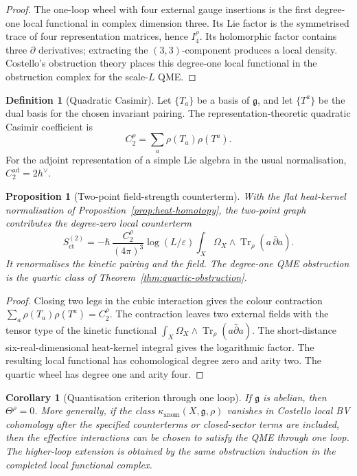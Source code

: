 \documentclass[11pt]{amsart}
\providecommand{\dbar}{\bar{\partial}}
\providecommand{\fg}{\mathfrak{g}}
\providecommand{\ad}{\operatorname{ad}}
\providecommand{\Tr}{\operatorname{Tr}}
\providecommand{\kanom}{\kappa_{\operatorname{anom}}}
\theoremstyle{plain}
\newtheorem{proposition}[theorem]{Proposition}
\newtheorem{corollary}[theorem]{Corollary}
\theoremstyle{definition}
\newtheorem{definition}[theorem]{Definition}
\theoremstyle{remark}
\begin{document}
\begin{proof}
The one-loop wheel with four external gauge insertions is the first
degree-one local functional in complex dimension three. Its Lie factor
is the symmetrised trace of four representation matrices, hence
\(I_4^\rho\). Its holomorphic factor contains three \(\partial\)
derivatives; extracting the \((3,3)\)-component produces a local
density. Costello's obstruction theory places this degree-one local
functional in the obstruction complex for the scale-\(L\) QME.
\end{proof}

\begin{definition}[Quadratic Casimir]
\label{def:quadratic-casimir}
Let \(\{T_a\}\) be a basis of \(\fg\), and let \(\{T^a\}\) be the dual
basis for the chosen invariant pairing. The representation-theoretic
quadratic Casimir coefficient is
\[
  C_2^\rho=\sum_a\rho(T_a)\rho(T^a).
\]
For the adjoint representation of a simple Lie algebra in the usual
normalisation, \(C_2^{\ad}=2h^\vee\).
\end{definition}

\begin{proposition}[Two-point field-strength counterterm]
\label{prop:field-strength-counterterm}
With the flat heat-kernel normalisation of
Proposition~\ref{prop:heat-homotopy}, the two-point graph contributes
the degree-zero local counterterm
\[
  S_{\mathrm{ct}}^{(2)}
  =
  -\hbar\,\frac{C_2^\rho}{(4\pi)^3}
  \log(L/\varepsilon)
  \int_X\Omega_X\wedge\Tr_\rho(a\,\dbar a).
\]
It renormalises the kinetic pairing and the field. The degree-one QME
obstruction is the quartic class of Theorem~\ref{thm:quartic-obstruction}.
\end{proposition}

\begin{proof}
Closing two legs in the cubic interaction gives the colour contraction
\(\sum_a\rho(T_a)\rho(T^a)=C_2^\rho\). The contraction leaves two
external fields with the tensor type of the kinetic functional
\(\int_X\Omega_X\wedge\Tr_\rho(a\dbar a)\). The short-distance
six-real-dimensional heat-kernel integral gives the logarithmic factor.
The resulting local functional has cohomological degree zero and arity
two. The quartic wheel has degree one and arity four.
\end{proof}

\begin{corollary}[Quantisation criterion through one loop]
\label{cor:one-loop-criterion}
If \(\fg\) is abelian, then \(\Theta^\rho=0\). More generally, if the
class \(\kanom(X,\fg,\rho)\) vanishes in Costello local BV cohomology
after the specified counterterms or closed-sector terms are included,
then the effective interactions can be chosen to satisfy the QME through
one loop. The higher-loop extension is obtained by the same obstruction
induction in the completed local functional complex.
\end{corollary}
\end{document}
